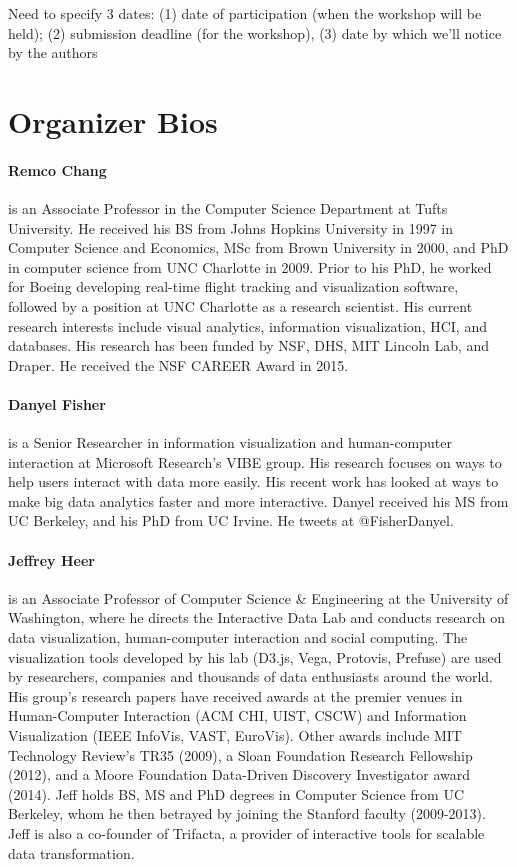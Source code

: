 \documentclass[journal]{vgtc}                %
\begin{document}
Need to specify 3 dates:
(1) date of participation (when the workshop will be held); (2) submission deadline (for the workshop), (3) date by which we'll notice by the authors

\section{Organizer Bios}

\paragraph*{Remco Chang} is an Associate Professor in the Computer Science Department at Tufts University. He received his BS from Johns Hopkins University in 1997 in Computer Science and Economics, MSc from Brown University in 2000, and PhD in computer science from UNC Charlotte in 2009. Prior to his PhD, he worked for Boeing developing real-time flight tracking and visualization software, followed by a position at UNC Charlotte as a research scientist. His current research interests include visual analytics, information visualization, HCI, and databases. His research has been funded by NSF, DHS, MIT Lincoln Lab, and Draper. He received the NSF CAREER Award in 2015.

\paragraph*{Danyel Fisher} is a Senior Researcher in information visualization and human-computer interaction at Microsoft Research's VIBE group. His research focuses on ways to help users interact with data more easily. His recent work has looked at ways to make big data analytics faster and more interactive. Danyel received his MS from UC Berkeley, and his PhD from UC Irvine. He tweets at @FisherDanyel.

\paragraph*{Jeffrey Heer} is an Associate Professor of Computer Science \& Engineering at the University of Washington, where he directs the Interactive Data Lab and conducts research on data visualization, human-computer interaction and social computing. The visualization tools developed by his lab (D3.js, Vega, Protovis, Prefuse) are used by researchers, companies and thousands of data enthusiasts around the world. His group's research papers have received awards at the premier venues in Human-Computer Interaction (ACM CHI, UIST, CSCW) and Information Visualization (IEEE InfoVis, VAST, EuroVis). Other awards include MIT Technology Review's TR35 (2009), a Sloan Foundation Research Fellowship (2012), and a Moore Foundation Data-Driven Discovery Investigator award (2014). Jeff holds BS, MS and PhD degrees in Computer Science from UC Berkeley, whom he then betrayed by joining the Stanford faculty (2009-2013). Jeff is also a co-founder of Trifacta, a provider of interactive tools for scalable data transformation.
\end{document}
